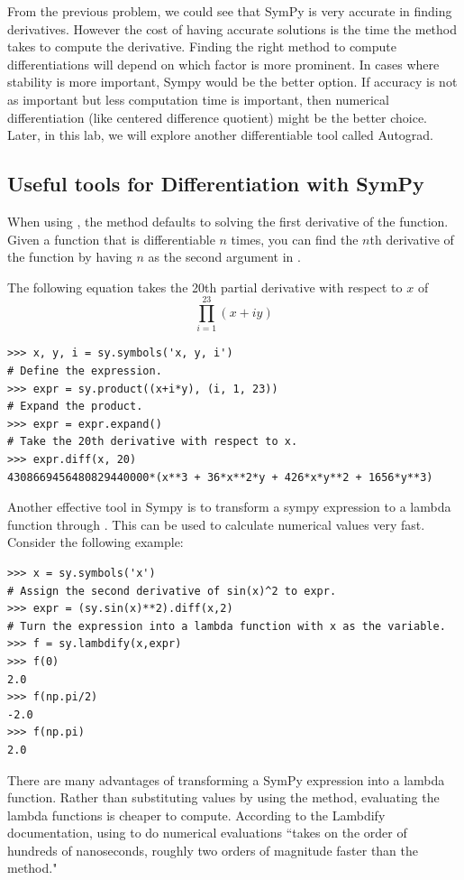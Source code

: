 From the previous problem, we could see that SymPy is very accurate in finding derivatives. However the cost of having accurate solutions is the time the method takes to compute the derivative. Finding the right method to compute differentiations will depend on which factor is more prominent. In cases where stability is more important, Sympy would be the better option. If accuracy is not as important but less computation time is important, then numerical differentiation (like centered difference quotient) might be the better choice. Later, in this lab, we will explore another differentiable tool called Autograd.

\subsection*{Useful tools for Differentiation with SymPy} %
When using , the method defaults to solving the first derivative of the function. Given a function that is differentiable $n$ times, you can find the $n$th derivative of the function by having $n$ as the second argument in .

The following equation takes the 20th partial derivative with respect to $x$ of
\begin{equation*}
\prod_{i=1}^{23} \left(x+i y\right)
\end{equation*}
\begin{lstlisting}
>>> x, y, i = sy.symbols('x, y, i')
# Define the expression.
>>> expr = sy.product((x+i*y), (i, 1, 23))
# Expand the product.
>>> expr = expr.expand()
# Take the 20th derivative with respect to x.
>>> expr.diff(x, 20)
4308669456480829440000*(x**3 + 36*x**2*y + 426*x*y**2 + 1656*y**3)
\end{lstlisting}

Another effective tool in Sympy is to transform a sympy expression to a lambda function through . This can be used to calculate numerical values very fast.
Consider the following example:
\begin{lstlisting}
>>> x = sy.symbols('x')
# Assign the second derivative of sin(x)^2 to expr.
>>> expr = (sy.sin(x)**2).diff(x,2)
# Turn the expression into a lambda function with x as the variable.
>>> f = sy.lambdify(x,expr)
>>> f(0)
2.0
>>> f(np.pi/2)
-2.0
>>> f(np.pi)
2.0
\end{lstlisting}

There are many advantages of transforming a SymPy expression into a lambda function. Rather than substituting values by using the  method, evaluating the lambda functions is cheaper to compute. According to the Lambdify documentation, using  to do numerical evaluations ``takes on the order of hundreds of nanoseconds, roughly two orders of magnitude faster than the  method."

